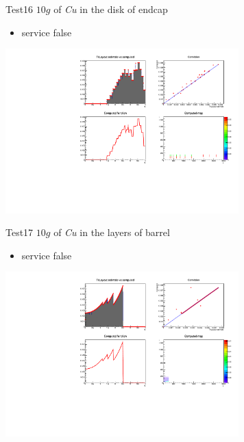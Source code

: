 \documentclass[pdftex, 11pt]{beamer}
\begin{document}
\begin{frame}
  \begin{block}{Test16}
    \alert{$10 g$} of \emph{Cu} in the disk of endcap
    \begin{itemize}
    \item \alert{service} false
    \end{itemize}
  \end{block}
  \begin{center}
    \includegraphics[width=9cm]{img/test16.pdf}
  \end{center}
\end{frame}

\begin{frame}
  \begin{block}{Test17}
    \alert{$10 g$} of \emph{Cu} in the layers of barrel
    \begin{itemize}
    \item \alert{service} false
    \end{itemize}
  \end{block}
  \begin{center}
    \includegraphics[width=9cm]{img/test17.pdf}
  \end{center}
\end{frame}
\end{document}
